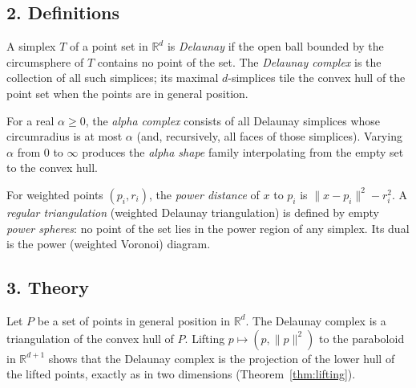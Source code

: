 \subsection{2. Definitions}

\begin{definition}\label{def:empty_circumsphere}
A simplex $T$ of a point set in $\mathbb{R}^d$ is \emph{Delaunay} if the open
ball bounded by the circumsphere of $T$ contains no point of the set. The
\emph{Delaunay complex} is the collection of all such simplices; its maximal
$d$-simplices tile the convex hull of the point set when the points are in
general position.
\end{definition}

\begin{definition}\label{def:delaunay_alpha_complex}
For a real $\alpha \ge 0$, the \emph{alpha complex} consists of all Delaunay
simplices whose circumradius is at most $\alpha$ (and, recursively, all faces of
those simplices). Varying $\alpha$ from $0$ to $\infty$ produces the
\emph{alpha shape} family interpolating from the empty set to the convex hull.
\end{definition}

\begin{definition}\label{def:regular_triangulation}
For weighted points $(p_i, r_i)$, the \emph{power distance} of $x$ to $p_i$ is
$\|x - p_i\|^2 - r_i^2$. A \emph{regular triangulation} (weighted Delaunay
triangulation) is defined by empty \emph{power spheres}: no point of the set
lies in the power region of any simplex. Its dual is the power (weighted
Voronoi) diagram.
\end{definition}

\subsection{3. Theory}

\begin{theorem}\label{thm:high_dim_delaunay}
Let $P$ be a set of points in general position in $\mathbb{R}^d$. The Delaunay
complex is a triangulation of the convex hull of $P$. Lifting $p \mapsto
(p, \|p\|^2)$ to the paraboloid in $\mathbb{R}^{d+1}$ shows that the Delaunay
complex is the projection of the lower hull of the lifted points, exactly as in
two dimensions (Theorem~\ref{thm:lifting}).
\end{theorem}

